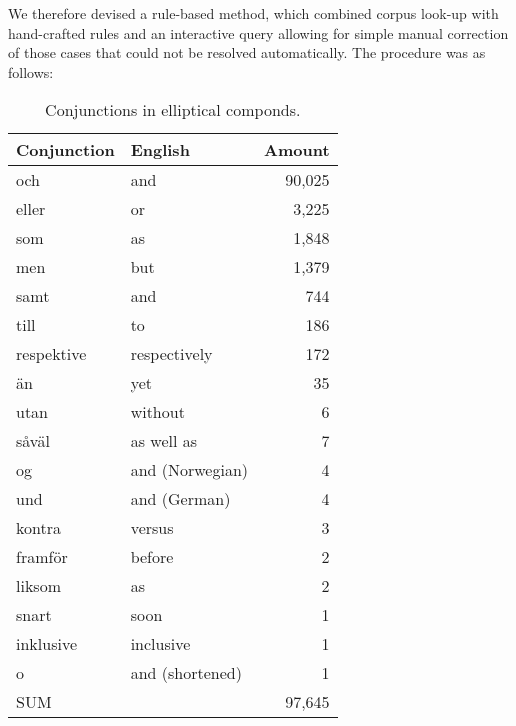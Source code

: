 We therefore devised a rule-based method, which combined corpus look-up with hand-crafted rules and an interactive query allowing for simple manual correction of those cases that could not be resolved automatically. The procedure was as follows:

\begin{table}[t!]
\begin{center}
\begin{tabular}{|l|l|r|}
\hline \textbf{Conjunction} & \textbf{English} & \textbf{Amount} \\ \hline
och & and & 90,025 \\
eller & or & 3,225 \\
som & as & 1,848 \\
men & but & 1,379 \\
samt & and & 744 \\
till & to & 186 \\
respektive & respectively & 172 \\
än & yet & 35 \\
utan & without & 6 \\
såväl & as well as & 7 \\
og & and (Norwegian) & 4 \\
und & and (German) & 4 \\
kontra & versus & 3 \\
framför & before & 2 \\
liksom & as & 2 \\
snart & soon & 1 \\
inklusive & inclusive & 1 \\
o & and (shortened) & 1 \\
\hline
SUM & & 97,645 \\
\hline
\end{tabular}
\end{center}
\caption{\label{konj-table} Conjunctions in elliptical componds. }
\end{table}


